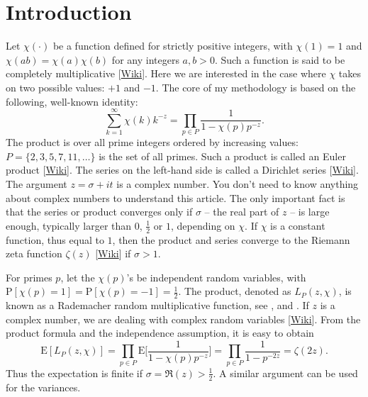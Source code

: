 \documentclass[oneside,10pt]{book}
\begin{document}
\hypersetup{linkcolor=red} 

\section{Introduction}\label{pivizintro}

Let $\chi(\cdot)$ be a function defined for strictly positive integers, with $\chi(1)=1$ and $\chi(ab)=\chi(a)\chi(b)$ for 
any integers $a,b>0$. Such a function is said to be
\textcolor{index}{completely multiplicative} [\href{https://en.wikipedia.org/wiki/Completely_multiplicative_function}{Wiki}]. 
Here we are interested in the case where $\chi$ takes on two possible values: $+1$ and $-1$. The core of my methodology is based on the following, well-known identity:
\begin{equation}
\sum_{k=1}^\infty \chi(k) k^{-z} = \prod_{p\in P} \frac{1}{1-\chi(p) p^{-z}}.\label{bore}
\end{equation}
The product is over all prime integers ordered by increasing values: $P=\{2,3,5,7,11,\dots\}$ is the set of all primes. Such a product is called an \textcolor{index}{Euler product} [\href{https://en.wikipedia.org/wiki/Euler_product}{Wiki}]. The series on the left-hand side is called
a \textcolor{index}{Dirichlet series} [\href{https://en.wikipedia.org/wiki/Dirichlet_series}{Wiki}]. The argument $z=\sigma+it$ is a complex number. You don't need to know anything about complex numbers to understand this article. The only important fact is that the series or product converges only if $\sigma$ -- the real part of $z$ -- is large enough, typically larger than $0$, $\frac{1}{2}$ or $1$, depending on $\chi$. If $\chi$ is a constant function, thus equal to $1$, then the product and series converge to the
 \textcolor{index}{Riemann zeta function} $\zeta(z)$ [\href{https://en.wikipedia.org/wiki/Riemann_zeta_function}{Wiki}] if $\sigma>1$.

For primes $p$,  let the $\chi(p)$'s be independent random variables, with $\text{P}[\chi(p)=1] =  \text{P}[\chi(p)=-1] =\frac{1}{2}$.
The product, denoted as $L_P(z,\chi)$, is known as a \textcolor{index}{Rademacher random multiplicative function}, see \cite{harper2020bb}, \cite{harper2020} and \cite{yukkam2013}. If $z$ is a complex number, we are dealing with
 \textcolor{index}{complex random variables} [\href{https://en.wikipedia.org/wiki/Complex_random_variable}{Wiki}]. From the product formula and the independence assumption, it is easy to obtain
\begin{equation}
\text{E} [L_P(z,\chi)]=\prod_{p\in P} \text{E}\bigg[\frac{1}{1-\chi(p)p^{-z}}\bigg]=\prod_{p\in P }\frac{1}{1-p^{-2z}}=\zeta(2z).\label{proofrn}
\end{equation}
Thus the expectation is finite if $\sigma=\Re(z)>\frac{1}{2}$. A similar argument can be used for the variances. 
\end{document}
